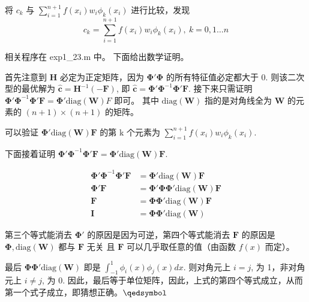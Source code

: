 将 \(c_k\) 与 \(\sum_{i=1}^{n+1}f\left(x_{i}\right) w_{i} \phi_{k}\left(x_{i}\right)\) 进行比较，发现
\begin{equation}
	c_k=\sum_{i=1}^{n+1}f\left(x_{i}\right) w_{i} \phi_{k}\left(x_{i}\right),\ k=0,1\dots n
\end{equation}

相关程序在 exp1\_23.m 中。
下面给出数学证明。

首先注意到 \(\mathbf{H}\) 必定为正定矩阵，因为 \(\mathbf{\Phi'\Phi}\) 的所有特征值必定都大于 0.
则该二次型的最优解为 \(\mathbf{\hat{c}}=\mathbf{H}^{-1}\mathbf{(-F)}\), 即 \(\mathbf{\hat{c}}=\mathbf{\Phi'\Phi}^{-1}\mathbf{\Phi' F}\).
接下来只需证明 \(\mathbf{\Phi'\Phi}^{-1}\mathbf{\Phi' F}=\mathbf{\Phi'}\text{diag}(\mathbf{W})F\) 即可。
其中 \(\text{diag}(\mathbf{W})\) 指的是对角线全为 \(\mathbf{W}\) 的元素的 \((n+1)\times (n+1)\) 的矩阵。

可以验证 \(\mathbf{\Phi'}\text{diag}(\mathbf{W})\mathbf{F}\) 的第 k 个元素为 \(\sum_{i=1}^{n+1}f\left(x_{i}\right) w_{i} \phi_{k}\left(x_{i}\right)\).

下面接着证明 \(\mathbf{\Phi'\Phi}^{-1}\mathbf{\Phi' F}=\mathbf{\Phi'}\text{diag}(\mathbf{W})\mathbf{F}\).

\begin{equation}
	\begin{aligned}
		\mathbf{\Phi'\Phi}^{-1}\mathbf{\Phi' F} &=\mathbf{\Phi'}\text{diag}(\mathbf{W})\mathbf{F} \\
		\mathbf{\Phi' F} &=\mathbf{\Phi'\Phi}\mathbf{\Phi'}\text{diag}(\mathbf{W})\mathbf{F} \\
		\mathbf{F} &=\mathbf{\Phi}\mathbf{\Phi'}\text{diag}(\mathbf{W})\mathbf{F} \\
		\mathbf{I} &=\mathbf{\Phi}\mathbf{\Phi'}\text{diag}(\mathbf{W})
	\end{aligned}
\end{equation}

\vspace{1em}
第三个等式能消去 \(\mathbf{\Phi'}\) 的原因是因为可逆，第四个等式能消去 \(\mathbf{F}\) 的原因是 \(\mathbf{\Phi},\text{diag}(\mathbf{W})\) 都与 \(\mathbf{F}\) 无关
且 \(\mathbf{F}\) 可以几乎取任意的值（由函数 \(f(x)\) 而定）。

最后 \(\mathbf{\Phi}\mathbf{\Phi'}\text{diag}(\mathbf{W})\) 即是 \(\int_{-1}^{1} \phi_{i}(x) \phi_{j}(x) d x\).
则对角元上 \(i=j\), 为 1，非对角元上 \(i\neq j\), 为 0.
因此，最后等于单位矩阵，因此，上式的第四个等式成立，从而第一个式子成立，即猜想正确。\hfill\(\qedsymbol\)

